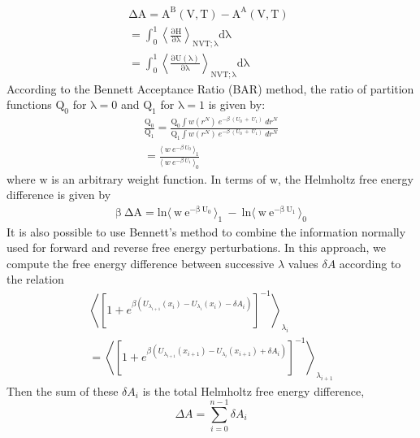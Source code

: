  \begin{eqnarray}
 \mathrm{\Delta{A}=A^{B}(V, T) - A^{A}(V, T)}~~\nonumber\\
 =\mathrm{\int_0^1\left\langle\frac{\partial H}{\partial\lambda}\right\rangle_{NVT;\lambda} d\lambda}~~~~\nonumber
 \\=\mathrm{\int_0^1\left\langle \frac{\partial U(\lambda)} {\partial\lambda} \right\rangle_{NVT;\lambda}d\lambda }
 \end{eqnarray}
  According to the Bennett Acceptance Ratio (BAR) \cite{BA} method, the ratio of partition functions $\mathrm{Q_{0}} $ for $\mathrm{\lambda}=0$ and $\mathrm{Q_{1}} $ for $\mathrm{\lambda}=1$ is given by:
 \begin{eqnarray}
 \frac{\mathrm{Q_{0}}}{\mathrm{Q_{1}}} =\frac{\mathrm{Q_{0}}\int w(r^{N})~e^{-\beta~(U_{0}~+~U_{1})}~dr^{N}}{\mathrm{Q_{1}}\int w(r^{N})~e^{-\beta~(U_{0}~+~U_{1})}~dr^{N}}\nonumber
 \\=\frac{\langle~w~e^{-\beta~U_{0}~}\rangle_{1}}{\langle~w~e^{-\beta~U_{1}~}\rangle_{0}}
 \label{equation11}
 \end{eqnarray}
 where $\mathrm{w}$ is an arbitrary weight function. In terms of $\mathrm{w}$, the Helmholtz free energy difference is given by
 \begin{eqnarray}
 \mathrm{\beta~\Delta A} =\mathrm{
 ln\langle~w~e^{-\beta~U_{0}~}\rangle_{1}}~-~\mathrm{
 ln\langle~w~e^{-\beta~U_{1}~}\rangle_{0}}
 \label{equation12}
 \end{eqnarray}
 It is also possible to use Bennett’s method to combine the information normally used for forward and reverse free energy perturbations. In this approach, we  compute the free energy difference between successive $\lambda$ values $\delta A$ according to the relation
 \begin{eqnarray}
 \left\langle \left[ 1+ e^{\beta \left( U_{\lambda_{i+1}}(x_i)- U_{\lambda_{i}}(x_i) - \delta A_i \right) }\right]^{-1} \right\rangle_{\lambda_i} ~~~~~~~~~~~~~~~~~ \nonumber\\ =
 \left\langle \left[1+ e^{\beta \left( U_{\lambda_{i+1}}(x_{i+1})- U_{\lambda_{i}}(x_{i+1}) + \delta A_i\right) }\right]^{-1} \right\rangle_{\lambda_{i+1}} 
 \end{eqnarray}
 Then the sum of these $\delta A_i$  is the total Helmholtz free energy difference\cite{BA}, 
 \begin{equation}
 \Delta A = \sum_{i=0}^{n-1} \delta A_i 
 \end{equation} 

